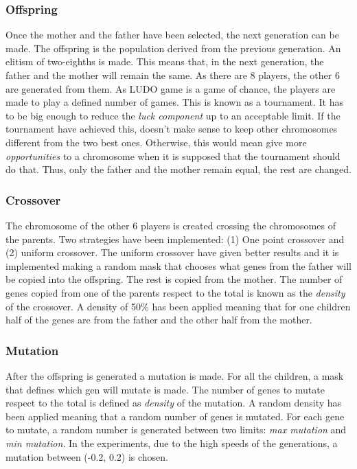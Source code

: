 		\subsubsection{Offspring} %
		\label{ssub:offspring}
		Once the mother and the father have been selected, the next generation can be made.
		The offspring is the population derived from the previous generation.
		An elitism of two-eighths is made.
		This means that, in the next generation, the father and the mother will remain the same.
		As there are 8 players, the other 6 are generated from them.
		As LUDO game is a game of chance, the players are made to play a defined number of games. This is known as a tournament.
		It has to be big enough to reduce the \emph{luck component} up to an acceptable limit.
		If the tournament have achieved this, doesn't make sense to keep other chromosomes different from the two best ones.
		Otherwise, this would mean give more \emph{opportunities} to a chromosome when it is supposed that the tournament should do that.
		Thus, only the father and the mother remain equal, the rest are changed.

		\subsubsection{Crossover} %
		\label{ssub:crossover}
		The chromosome of the other 6 players is created crossing the chromosomes of the parents.
		Two strategies have been implemented: (1) One point crossover and (2) uniform crossover.
		The uniform crossover have given better results and it is implemented making a random mask that chooses what genes from the father will be copied into the offspring. 
		The rest is copied from the mother.
		The number of genes copied from one of the parents respect to the total is known as the \emph{density} of the crossover.
		A density of 50\% has been applied meaning that for one children half of the genes are from the father and the other half from the mother.

		\subsubsection{Mutation} %
		\label{ssub:mutation}
		After the offspring is generated a mutation is made.
		For all the children, a mask that defines which gen will mutate is made. 
		The number of genes to mutate respect to the total is defined as \emph{density} of the mutation.
		A random density has been applied meaning that a random number of genes is mutated.
		For each gene to mutate, a random number is generated between two limits: \emph{max mutation} and \emph{min mutation}.
		In the experiments, due to the high speeds of the generations, a mutation between (-0.2, 0.2) is chosen.

